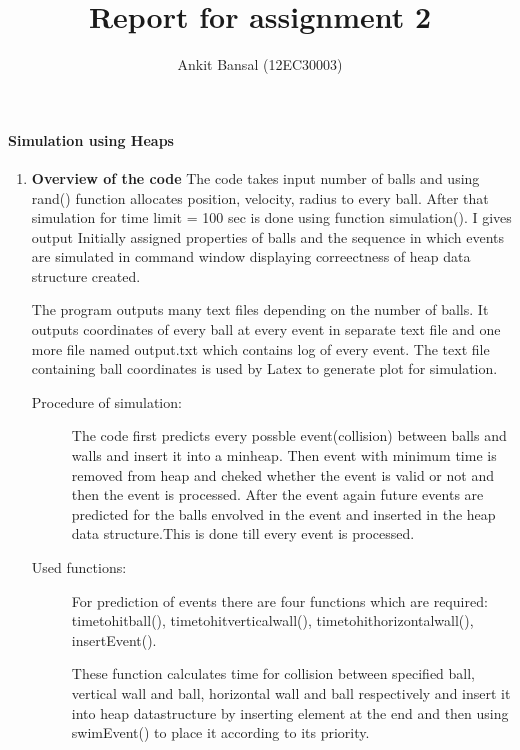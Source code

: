 \documentclass[a4paper,11pt]{article}
\title{Report for assignment 2}
\author{Ankit Bansal (12EC30003)}
\begin{document}
\maketitle

\paragraph{Simulation using Heaps}
\begin{enumerate}
 \item \textbf{Overview of the code}
The code takes input number of balls and using rand() function allocates position, velocity, radius to every ball. After that simulation for time limit = 100 sec is done using function simulation(). I gives output Initially assigned properties of balls and the sequence in which events are simulated in command window displaying correectness of heap data structure created.

The program outputs many text files depending on the number of balls. It outputs coordinates of every ball at every event in separate text file and one more file named output.txt which contains log of every event. The text file containing ball coordinates is used by Latex to generate plot for simulation.
\begin{description}
  \item[Procedure of simulation:]
The code first predicts every possble event(collision) between balls and walls and insert it into a minheap. Then event with minimum time is removed from heap and cheked whether the event is valid or not and then the event is processed. After the event again future events are predicted for the balls envolved in the event and inserted in the heap data structure.This is done till every event is processed.

  \item[Used functions:]
For prediction of events there are four functions which are required:
timetohitball(), timetohitverticalwall(), timetohithorizontalwall(), insertEvent().

These function calculates time for collision between specified ball, vertical wall and ball, horizontal wall and ball respectively and insert it into heap datastructure by inserting element at the end and then using swimEvent() to place it according to its priority.


\end{description}
\end{enumerate}
\end{document}
